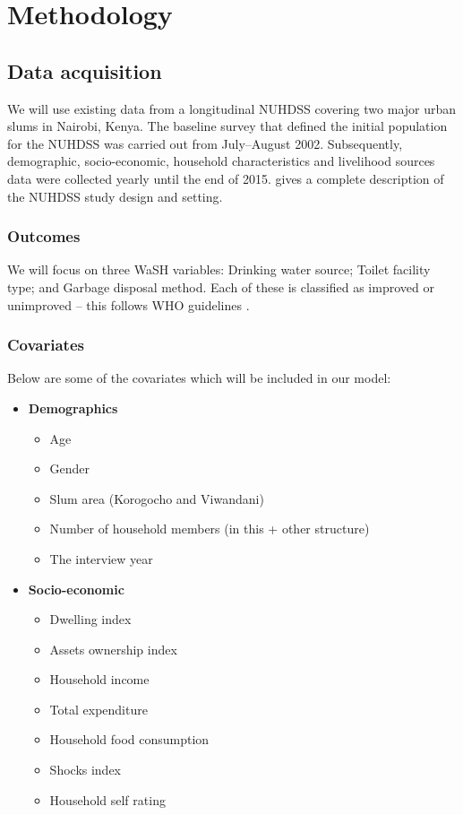 \section*{Methodology}

\subsection*{Data acquisition}

We will use existing data from a longitudinal NUHDSS covering two major urban slums in Nairobi, Kenya. The baseline survey that defined the initial population for the NUHDSS was carried out from July–August 2002. Subsequently, demographic, socio-economic, household characteristics  and livelihood sources data were collected yearly until the end of 2015. \citet{beguy2015health} gives a complete description of the NUHDSS study design and setting.

\subsubsection*{Outcomes}

We will focus on three WaSH variables: Drinking water source; Toilet facility type; and Garbage disposal method. Each of these is classified as improved or unimproved -- this follows WHO guidelines \citep{journal.pone.0151645}.

\subsubsection*{Covariates}

Below are some of the covariates which will be included in our model:

\begin{itemize}
\item \textbf{Demographics}
\begin{itemize}
\item Age
\item Gender
\item Slum area (Korogocho and Viwandani)
\item  Number of household members (in this + other structure)
\item The interview year
\end{itemize}
\item \textbf{Socio-economic}
\begin{itemize}
\item Dwelling index
\item Assets ownership index
\item Household income
\item Total expenditure
\item Household food consumption
\item Shocks index
\item Household self rating
\end{itemize}
\end{itemize}

